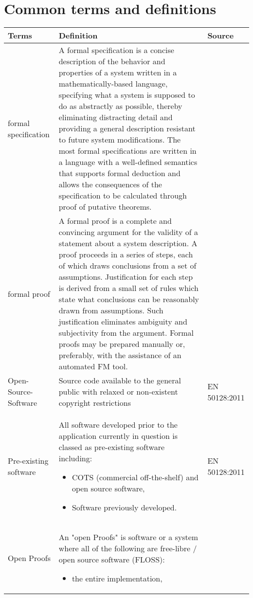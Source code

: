 \documentclass{template/openetcs_report}
\begin{document}
\section{Common terms and definitions}
\begin{table} [h]
\begin{tabular}{|p{2cm}|p{9cm}|p{3cm}|}
\hline
\bfseries Terms & \bfseries Definition & \bfseries Source \\ 
\hline 
\hline
formal specification  & A formal specification is a concise description of the behavior and properties of a system written in a mathematically-based language, specifying what a system is supposed to do as abstractly as possible, thereby eliminating distracting detail and providing a general description resistant to future system modifications. The most formal specifications are written in a language with a well-defined semantics that supports formal deduction and allows the consequences of the specification to be calculated through proof of putative theorems. & \cite{FM-doc}\\ 
\hline
formal proof  & A formal proof is a complete and convincing argument for the validity of a statement about a system description. A proof proceeds in a series of steps, each of which draws conclusions from a set of assumptions. Justification for each step is derived from a small set of rules which state what conclusions can be reasonably drawn from assumptions. Such justification eliminates ambiguity and subjectivity from the argument. Formal proofs may be prepared manually or, preferably, with the assistance of an automated FM tool. & \cite{FM-doc}\\ 
\hline
Open-Source-Software & Source code available to the general public with relaxed or non-existent copyright restrictions & EN 50128:2011 \\ 
\hline
Pre-existing software & All software developed prior to the application currently in question is classed as pre-existing software including: 
\begin{itemize}
\item COTS (commercial off-the-shelf) and open source software,
\item Software previously developed.
\end{itemize} & EN 50128:2011 \\ 
\hline
Open Proofs & An "open Proofs" is software or a system where all of the following are free-libre / open source software (FLOSS): 
\begin{itemize}
\item the entire implementation,

\end{itemize}
\end{tabular}
\end{table}
\end{document}
